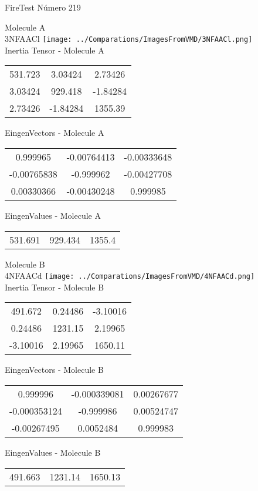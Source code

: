 \vtab[-2cm]
\begin{center}
{\large FireTest \tab Número 219}
\end{center}
\begin{multicols}{2}
\begin{center}

Molecule A \\ 
3NFAACl
\texttt{[image: ../Comparations/ImagesFromVMD/3NFAACl.png]}
\\
Inertia Tensor - Molecule A \\
\vtab

\begin{tabular}{|c c c|}
531.723	 & 	3.03424	 & 	2.73426	 \\
3.03424	 & 	929.418	 & 	-1.84284	 \\
2.73426	 & 	-1.84284	 & 	1355.39
\end{tabular}

\vtab
 EingenVectors - Molecule A     \\
\vtab
\begin{tabular}{|c c c|}
0.999965	 & 	-0.00764413	 & 	-0.00333648	 \\
-0.00765838	 & 	-0.999962	 & 	-0.00427708	 \\
0.00330366	 & 	-0.00430248	 & 	0.999985
\end{tabular}

\vtab
 EingenValues - Molecule A     \\
\vtab
\begin{tabular}{|c c c|}
531.691	 & 	929.434	 & 	1355.4	 \\
\end{tabular}
\columnbreak

Molecule B \\ 
4NFAACd
\texttt{[image: ../Comparations/ImagesFromVMD/4NFAACd.png]}
\\
Inertia Tensor - Molecule B \\
\vtab

\begin{tabular}{|c c c|}
491.672	 & 	0.24486	 & 	-3.10016	 \\
0.24486	 & 	1231.15	 & 	2.19965	 \\
-3.10016	 & 	2.19965	 & 	1650.11
\end{tabular}

\vtab
 EingenVectors - Molecule B     \\
\vtab
\begin{tabular}{|c c c|}
0.999996	 & 	-0.000339081	 & 	0.00267677	 \\
-0.000353124	 & 	-0.999986	 & 	0.00524747	 \\
-0.00267495	 & 	0.0052484	 & 	0.999983
\end{tabular}

\vtab
 EingenValues - Molecule B     \\
\vtab
\begin{tabular}{|c c c|}
491.663	 & 	1231.14	 & 	1650.13	 \\
\end{tabular}

\end{center}
\end{multicols}
